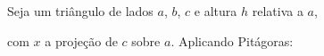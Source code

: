 \documentclass[preview]{standalone}
\begin{document}
\begin{center}
Seja um triângulo de lados $a$, $b$, $c$ e altura $h$ relativa a $a$,\\com $x$ a projeção de $c$ sobre $a$. Aplicando Pitágoras:
\end{center}
\end{document}
